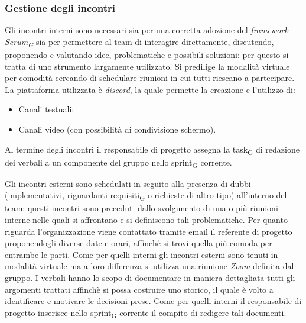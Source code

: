     \subsubsection{Gestione degli incontri}
        Gli incontri interni sono necessari sia per una corretta adozione del \textit{framework Scrum\textsubscript{G}}
        sia per permettere al team di interagire direttamente, discutendo, proponendo e valutando idee, problematiche e possibili 
        soluzioni: per questo si tratta di uno strumento largamente utilizzato.
        \newline
        Si predilige la modalità virtuale per comodità cercando di schedulare riunioni in cui tutti riescano a partecipare.
        \newline
        La piattaforma utilizzata è \textit{discord}, la quale permette la creazione e l'utilizzo di:
        \begin{itemize}
            \item Canali testuali;
            \item Canali video (con possibilità di condivisione schermo).
        \end{itemize}
        Al termine degli incontri il responsabile di progetto assegna la task\textsubscript{G} di redazione dei verbali a un componente del gruppo nello sprint\textsubscript{G} corrente. 

        Gli incontri esterni sono schedulati in seguito alla presenza di dubbi (implementativi, riguardanti requisiti\textsubscript{G} o richieste di altro tipo) all'interno del 
        team: questi incontri sono preceduti dallo svolgimento di una o più riunioni interne nelle quali si affrontano e si definiscono tali problematiche.
        \newline
        Per quanto riguarda l'organizzazione viene contattato tramite email il referente di progetto proponendogli diverse date e orari, affinchè si trovi quella 
        più comoda per entrambe le parti. 
        \newline
        Come per quelli interni gli incontri esterni sono tenuti in modalità virtuale ma a loro differenza si utilizza una riunione \textit{Zoom} definita dal gruppo. 
        \newline
        I verbali hanno lo scopo di documentare in maniera dettagliata tutti gli argomenti trattati affinchè si possa costruire uno storico, il quale è volto a 	identificare e motivare le decisioni prese.
        \newline
        Come per quelli interni il responsabile di progetto inserisce nello sprint\textsubscript{G} corrente il compito di redigere tali documenti.

